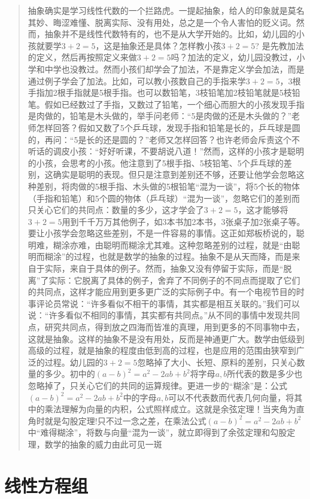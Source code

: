 \documentclass[hyperref,]{ctexart}
\begin{document}
\begin{quote}
\small{抽象确实是学习线性代数的一个拦路虎。一提起抽象，给人的印象就是莫名其妙、晦涩难懂、脱离实际、没有用处，总之是一个令人害怕的贬义词。然而，抽象并不是线性代数特有的，也不是从大学开始的。比如，幼儿园的小孩就要学$3+2=5$，这是抽象还是具体？怎样教小孩$3+2=5$? 是先教加法的定义，然后再按照定义来做$3+2=5$吗？加法的定义，幼儿园没教过，小学和中学也没教过。然而小孩们却学会了加法，不是靠定义学会加法，而是通过例子学会了加法。比如，可以教小孩数自己的手指来学$3+2=5$，3根手指加2根手指就是5根手指。也可以数铅笔，3枝铅笔加2枝铅笔就是5枝铅笔。假如已经数过了手指，又数过了铅笔，一个细心而胆大的小孩发现手指是肉做的，铅笔是木头做的，举手问老师：“5是肉做的还是木头做的？”老师怎样回答？假如又数了5个乒乓球，发现手指和铅笔是长的，乒乓球是圆的，再问：“5是长的还是圆的？”老师又怎样回答？也许老师会斥责这个不听话的调皮小孩：“好好听课，不要胡说八道！”然而，这样的小孩才是聪明的小孩，会思考的小孩。他注意到了5根手指、5枝铅笔、5个乒乓球的差别，这确实是聪明的表现。但只是注意到差别还不够，还要让他学会忽略这种差别，将肉做的5根手指、木头做的5根铅笔“混为一谈”，将5个长的物体（手指和铅笔）和5个圆的物体（乒乓球）“混为一谈”，忽略它们的差别而只关心它们的共同点：数量的多少，这才学会了$3+2=5$，这才能够将$3+2=5$用到千千万万其他例子，如3本书加2本书，3张桌子加2张桌子等。要让小孩学会忽略这些差别，不是一件容易的事情。这正如郑板桥说的，聪明难，糊涂亦难，由聪明而糊涂尤其难。这种忽略差别的过程，就是“由聪明而糊涂”的过程，也就是数学的抽象的过程。抽象不是从天而降，而是来自于实际，来自于具体的例子。然而，抽象又没有停留于实际，而是“脱离”了实际：它脱离了具体的例子，舍弃了不同例子的不同点而提取了它们的共同点，这样才能应用到更多更广泛的实际例子中。有一个电视节目的时事评论员常说：“许多看似不相干的事情，其实都是相互关联的。”我们可以说：“许多看似不相同的事情，其实都有共同点。”从不同的事情中发现共同点，研究共同点，得到放之四海而皆准的真理，用到更多的不同事物中去，这就是抽象。这样的抽象不是没有用处，反而是神通更广大。数学由低级到高级的过程，就是抽象的程度由低到高的过程，也是应用的范围由狭窄到广泛的过程。幼儿园的$3+2=5$忽略掉了大小、长短、原料的差别，只关心数量的多少。初中的$(a-b)^2=a^2-2ab+b^2$将字母$a,b$所代表的数是多少也忽略掉了，只关心它们的共同的运算规律。更进一步的“糊涂”是：公式$(a-b)^2=a^2-2ab+b^2$中的字母$a,b$可以不代表数而代表几何向量，将其中的乘法理解为向量的内积，公式照样成立。这就是余弦定理！当夹角为直角时就是勾股定理!只不过一念之差，在乘法公式$(a-b)^2=a^2-2ab+b^2$中“难得糊涂”，将数与向量“混为一谈”，就立即得到了余弦定理和勾股定理，数学的抽象的威力由此可见一斑}
\end{quote}

\section{线性方程组}
\end{document}
